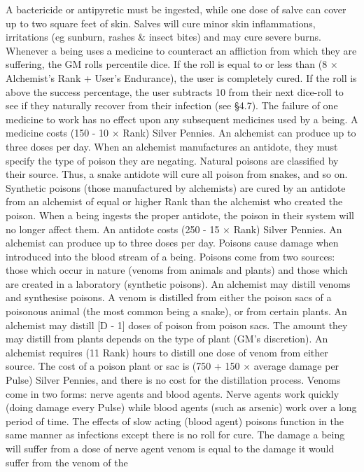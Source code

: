 \documentclass[a4paper]{article}
\begin{document}
\begin{multicols}{3}
A bactericide or antipyretic must be ingested, while
one dose of salve can cover up to two square feet
of skin. Salves will cure minor skin inflammations,
irritations (eg sunburn, rashes & insect bites) and
may cure severe burns.
Whenever a being uses a medicine to counteract an
affliction from which they are suffering, the GM
rolls percentile dice. If the roll is equal to or less
than (8 × Alchemist’s Rank + User’s Endurance),
the user is completely cured. If the roll is above the
success percentage, the user subtracts 10 from their
next dice-roll to see if they naturally recover from
their infection (see §4.7). The failure of one medicine to work has no effect upon any subsequent
medicines used by a being.
A medicine costs (150 - 10 × Rank) Silver Pennies.
An alchemist can produce up to three doses per
day.
When an alchemist manufactures an antidote, they
must specify the type of poison they are negating.
Natural poisons are classified by their source.
Thus, a snake antidote will cure all poison from
snakes, and so on. Synthetic poisons (those manufactured by alchemists) are cured by an antidote
from an alchemist of equal or higher Rank than the
alchemist who created the poison. When a being
ingests the proper antidote, the poison in their
system will no longer affect them.
An antidote costs (250 - 15 × Rank) Silver Pennies.
An alchemist can produce up to three doses per
day.
Poisons cause damage when introduced into the
blood stream of a being.
Poisons come from two sources: those which occur
in nature (venoms from animals and plants) and
those which are created in a laboratory (synthetic
poisons). An alchemist may distill venoms and
synthesise poisons. A venom is distilled from
either the poison sacs of a poisonous animal (the
most common being a snake), or from certain
plants. An alchemist may distill [D - 1] doses of
poison from poison sacs. The amount they may
distill from plants depends on the type of plant
(GM’s discretion). An alchemist requires (11 Rank) hours to distill one dose of venom from
either source. The cost of a poison plant or sac is
(750 + 150 × average damage per Pulse) Silver
Pennies, and there is no cost for the distillation
process.
Venoms come in two forms: nerve agents and
blood agents. Nerve agents work quickly (doing
damage every Pulse) while blood agents (such as
arsenic) work over a long period of time. The
effects of slow acting (blood agent) poisons function in the same manner as infections except there
is no roll for cure. The damage a being will suffer
from a dose of nerve agent venom is equal to the
damage it would suffer from the venom of the

\end{multicols}
\end{document}
